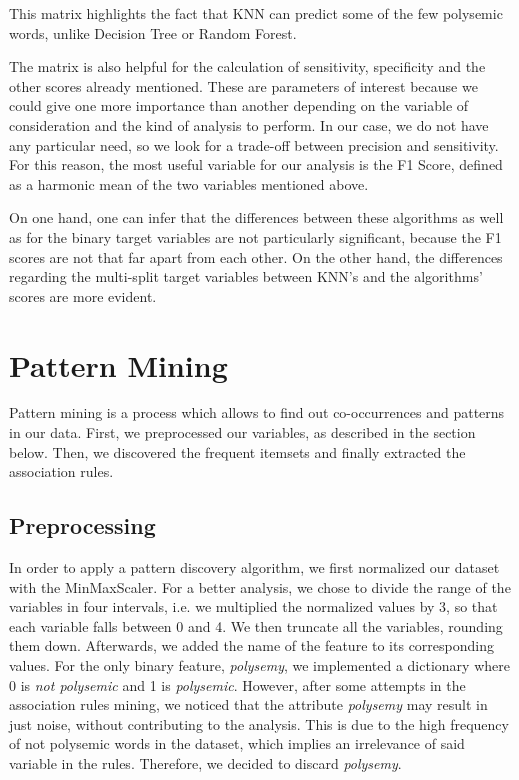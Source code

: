 \documentclass[a4paper,11pt,dvipsnames]{article}
\begin{document}
This matrix highlights the fact that KNN can predict some of the few polysemic words, unlike Decision Tree or Random Forest.  

The matrix is also helpful for the calculation of sensitivity, specificity and the other scores already mentioned. These are parameters of interest because we could give one more importance than another depending on the variable of consideration and the kind of analysis to perform. In our case, we do not have any particular need, so we look for a trade-off between precision and sensitivity. For this reason, the most useful variable for our analysis is the F1 Score, defined as a harmonic mean of the two variables mentioned above.

On one hand, one can infer that the differences between these algorithms as well as for the binary target variables are not particularly significant, because the F1 scores are not that far apart from each other. On the other hand, the differences regarding the multi-split target variables between KNN's and the algorithms' scores are more evident. 

\section{Pattern Mining}
Pattern mining is a process which allows to find out co-occurrences and patterns in our data. First, we preprocessed our variables, as described in the section below. Then, we discovered the frequent itemsets and finally extracted the association rules. 

\subsection{Preprocessing}
In order to apply a pattern discovery algorithm, we first normalized our dataset with the MinMaxScaler. For a better analysis, we chose to divide the range of the variables in four intervals, i.e. we  multiplied the normalized values by 3, so that each variable falls between 0 and 4. We then truncate all the variables, rounding them down. Afterwards, we added the name of the feature to its corresponding values. For the only binary feature, \textit{polysemy}, we implemented a dictionary where 0 is \textit{not polysemic} and 1 is \textit{polysemic}. However, after some attempts in the association rules mining, we noticed that the attribute \textit{polysemy} may result in just noise, without contributing to the analysis. This is due to the high frequency of not polysemic words in the dataset, which implies an irrelevance of said variable in the rules.
Therefore, we decided to discard \textit{polysemy}.
\end{document}
